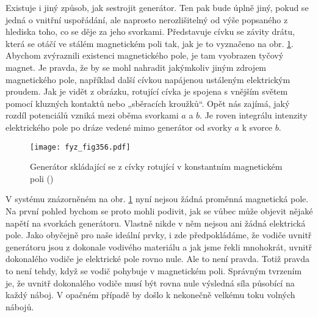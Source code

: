   Existuje i jiný způsob, jak sestrojit generátor. Ten pak bude úplně jiný, pokud se jedná o 
  vnitřní uspořádání, ale naprosto nerozlišitelný od výše popsaného z hlediska toho, co se děje za 
  jeho svorkami. Představuje cívku se závity drátu, která se otáčí ve stálém magnetickém poli tak, 
  jak je to vyznačeno na obr. \ref{fyz:fig356}. Abychom zvýraznili existenci magnetického pole, je 
  tam vyobrazen tyčový magnet. Je pravda, že by se mohl nahradit jakýmkoliv jiným zdrojem 
  magnetického pole, například další cívkou napájenou ustáleným elektrickým proudem. Jak je vidět z 
  obrázku, rotující cívka je spojena s vnějším světem pomocí kluzných kontaktů nebo „sběracích 
  kroužků“. Opět nás zajímá, jaký rozdíl potenciálů vzniká mezi oběma svorkami \(a\) a \(b\). Je 
  roven integrálu intenzity elektrického pole po dráze vedené mimo generátor od svorky \(a\) k 
  svorce \(b\).

  \begin{figure}[ht!] %
    \centering
    \texttt{[image: fyz\_fig356.pdf]}
    \caption{Generátor skládající se z cívky rotující v konstantním magnetickém poli
             (\cite[s.~397]{Feynman02})}
    \label{fyz:fig356}
  \end{figure}
  
  V systému znázorněném na obr. \ref{fyz:fig356} nyní nejsou žádná proměnná magnetická pole. Na 
  první pohled bychom se proto mohli podivit, jak se vůbec může objevit nějaké napětí na svorkách 
  generátoru. Vlastně nikde v něm nejsou ani žádná elektrická pole. Jako obyčejně pro naše ideální 
  prvky, i zde předpokládáme, že vodiče uvnitř generátoru jsou z dokonale vodivého materiálu a jak 
  jsme řekli mnohokrát, uvnitř dokonalého vodiče je elektrické pole rovno nule. Ale to není pravda. 
  Totiž pravda to není tehdy, když se vodič pohybuje v magnetickém poli. Správným tvrzením je, že 
  uvnitř dokonalého vodiče musí být rovna nule výsledná síla působící na každý náboj. V opačném 
  případě by došlo k nekonečně velkému toku volných nábojů.
  

